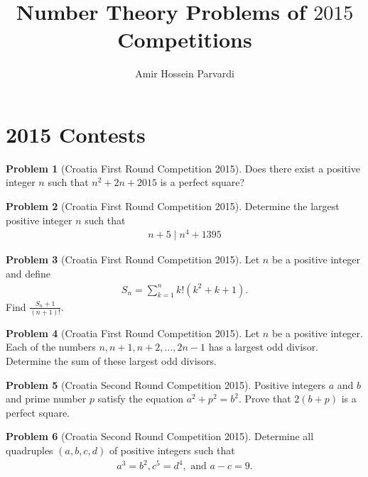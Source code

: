 \documentclass[]{article}
\title{Number Theory Problems of $2015$ Competitions}
\author{Amir Hossein Parvardi}
\theoremstyle{definition}
\newtheorem{problem}{Problem}
\begin{document}
	
\maketitle

\section{2015 Contests}


\begin{problem}[Croatia First Round Competition 2015]
	Does there exist a positive integer $n$ such that $n^2+2n+2015$ is a perfect square?
\end{problem}

\begin{problem}[Croatia First Round Competition 2015]
	Determine the largest positive integer $n$ such that
		\begin{align*}
			n+5 \mid n^4 + 1395
		\end{align*}
\end{problem}


\begin{problem}[Croatia First Round Competition 2015]
	Let $n$ be a positive integer and define
		\begin{align*}
			S_n = \sum_{k=1}^{n} k!(k^2+k+1).
		\end{align*}
	Find $\frac{S_n + 1}{(n+1)!}$.
\end{problem}


\begin{problem}[Croatia First Round Competition 2015]
	Let $n$ be a positive integer. Each of the numbers $n, n + 1, n + 2, \dots , 2n -1$ has a largest odd divisor. Determine the sum of these largest odd divisors.
\end{problem}


\begin{problem}[Croatia Second Round Competition 2015]
	Positive integers $a$ and $b$ and prime number $p$ satisfy the equation $a^2 + p^2 = b^2$.	Prove that $2(b + p)$ is a perfect square.
\end{problem}


\begin{problem}[Croatia Second Round Competition 2015]
	Determine all quadruples $(a, b, c, d)$ of positive integers such that
		\begin{align*}
			a^3 = b^2, c^5 = d^4, \text{ and } a - c = 9.
		\end{align*}
\end{problem}
\end{document}

